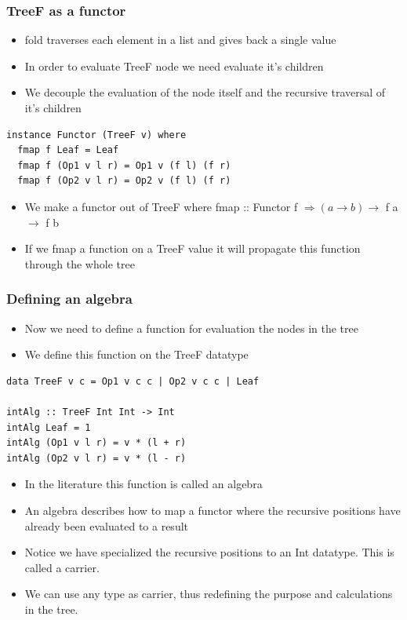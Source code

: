 \documentclass[10pt]{beamer}
\begin{document}
\begin{frame}[fragile]
\frametitle{TreeF as a functor}
\begin{itemize}
\item fold traverses each element in a list and gives back a single value 
\item In order to evaluate TreeF node we need evaluate it's children
\item We decouple the evaluation of the node itself and the recursive traversal of it's children	
\end{itemize}

\begin{lstlisting}
instance Functor (TreeF v) where
  fmap f Leaf = Leaf
  fmap f (Op1 v l r) = Op1 v (f l) (f r)
  fmap f (Op2 v l r) = Op2 v (f l) (f r)
\end{lstlisting}


\begin{itemize}
\item We make a functor out of TreeF where fmap :: Functor f $ \Rightarrow (a \rightarrow b) \rightarrow$ f a $\rightarrow$ f b
\item If we fmap a function on a TreeF value it will propagate this function through the whole tree 
\end{itemize}

\end{frame}



\begin{frame}[fragile]
\frametitle{Defining an algebra}
\begin{itemize}
\item Now we need to define a function for evaluation the nodes in the tree 
\item We define this function on the TreeF datatype 
\end{itemize}

\begin{lstlisting}
data TreeF v c = Op1 v c c | Op2 v c c | Leaf

intAlg :: TreeF Int Int -> Int
intAlg Leaf = 1
intAlg (Op1 v l r) = v * (l + r)
intAlg (Op2 v l r) = v * (l - r)
\end{lstlisting}


\begin{itemize}
\item In the literature this function is called an algebra
\item An algebra describes how to map a functor where the recursive positions have already been evaluated to a result
\item Notice we have specialized the recursive positions to an Int datatype. This is called a carrier. 	
\item We can use any type as carrier, thus redefining the purpose and calculations in the tree. 	
\end{itemize}

\end{frame}
\end{document}
